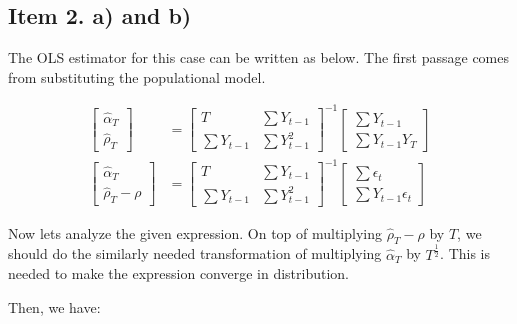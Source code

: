 \documentclass[12pt]{article}
\begin{document}
\subsection*{Item 2. a) and b)}

The OLS estimator for this case can be written as below. The first passage comes from substituting the populational model.

\begin{align*}
    \begin{bmatrix}
        \hat{\alpha}_T\\ \hat{\rho}_T
    \end{bmatrix} &=
    \begin{bmatrix}
        T & \sum Y_{t-1}\\ \sum Y_{t-1} & \sum Y^2_{t-1}
    \end{bmatrix}^{-1}
    \begin{bmatrix}
        \sum Y_{t-1} \\ \sum Y_{t-1}Y_T
    \end{bmatrix}\\
    \begin{bmatrix}
        \hat{\alpha}_T\\ \hat{\rho}_T - \rho
    \end{bmatrix} &= \begin{bmatrix}
        T & \sum Y_{t-1}\\ \sum Y_{t-1} & \sum Y^2_{t-1}
    \end{bmatrix}^{-1}
    \begin{bmatrix}
        \sum \epsilon_t \\ \sum Y_{t-1}\epsilon_t
    \end{bmatrix}
\end{align*}

Now lets analyze the given expression. On top of multiplying $\hat{\rho}_T - \rho$ by $T$, we should do the similarly needed transformation of multiplying $\hat{\alpha}_T$ by $T^{\frac{1}{2}}$. This is needed to make the expression converge in distribution.

Then, we have:
\end{document}
